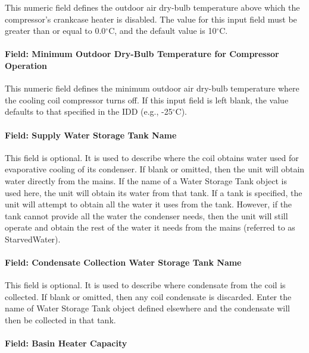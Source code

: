 This numeric field defines the outdoor air dry-bulb temperature above which the compressor's crankcase heater is disabled. The value for this input field must be greater than or equal to 0.0$^\circ$C, and the default value is 10$^\circ$C.

\paragraph{Field: Minimum Outdoor Dry-Bulb Temperature for Compressor Operation}

This numeric field defines the minimum outdoor air dry-bulb temperature where the cooling coil compressor turns off. If this input field is left blank, the value defaults to that specified in the IDD (e.g., -25$^\circ$C).

\paragraph{Field: Supply Water Storage Tank Name}\label{field-supply-water-storage-tank-name-4-000}

This field is optional. It is used to describe where the coil obtains water used for evaporative cooling of its condenser. If blank or omitted, then the unit will obtain water directly from the mains. If the name of a Water Storage Tank object is used here, the unit will obtain its water from that tank. If a tank is specified, the unit will attempt to obtain all the water it uses from the tank. However, if the tank cannot provide all the water the condenser needs, then the unit will still operate and obtain the rest of the water it needs from the mains (referred to as StarvedWater).

\paragraph{Field: Condensate Collection Water Storage Tank Name}\label{field-condensate-collection-water-storage-tank-name-6}

This field is optional. It is used to describe where condensate from the coil is collected. If blank or omitted, then any coil condensate is discarded. Enter the name of Water Storage Tank object defined elsewhere and the condensate will then be collected in that tank.

\paragraph{Field: Basin Heater Capacity}\label{field-basin-heater-capacity-4}

